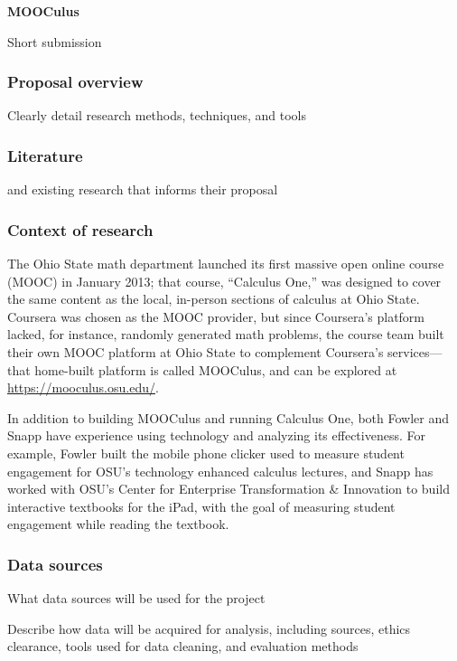 \documentclass[12pt]{article}
\begin{document}
\begin{center}
  \textbf{MOOCulus}
\end{center}

Short submission

\subsubsection*{Proposal overview}

Clearly detail research methods, techniques, and tools

\subsubsection*{Literature}

and existing research
that informs their proposal
 
\subsubsection*{Context of research}

The Ohio State math department launched its first massive open online
course (MOOC) in January 2013; that course, ``Calculus One,'' was
designed to cover the same content as the local, in-person sections of
calculus at Ohio State.  Coursera was chosen as the MOOC provider, but
since Coursera's platform lacked, for instance, randomly generated
math problems, the course team built their own MOOC platform at Ohio
State to complement Coursera's services---that home-built platform is
called MOOCulus, and can be explored at
\url{https://mooculus.osu.edu/}.

In addition to building MOOCulus and running Calculus One, both Fowler
and Snapp have experience using technology and analyzing its
effectiveness.  For example, Fowler built the mobile phone clicker
used to measure student engagement for OSU's technology enhanced
calculus lectures, and Snapp has worked with OSU's Center for
Enterprise Transformation \& Innovation to build interactive textbooks
for the iPad, with the goal of measuring student engagement while
reading the textbook.

\subsubsection*{Data sources}

What data sources will be used for the project

Describe how data will be acquired for analysis, including sources,
ethics clearance, tools used for data cleaning, and evaluation
methods
\end{document}

